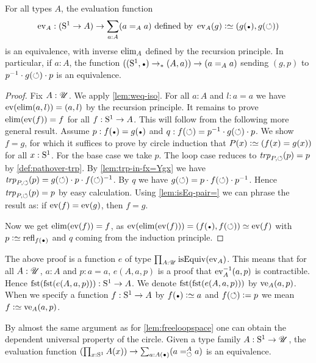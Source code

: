 \begin{lemma}\label{lem:freeloopspace}
For all types $A$, the evaluation function 
\[
\ev_A : (\Sc\to A)\to \sum_{a:A}(a=_Aa)\text{~defined by~} 
\ev_A(g)\defeq (g(\base),g(\Sloop))
\]
is an equivalence, with inverse $\mathrm{elim}_A$ defined by the recursion principle.  
In particular, if $a:A$, the function $((\Sc,\base)\to_* (A,a))\to (a=_Aa)$
sending $(g,p)$ to $p^{-1}\cdot g(\circlearrowleft)\cdot p$ is an equivalence.
\end{lemma}
\begin{proof}
Fix $A:{\mathscr{U}}$. We apply \cref{lem:weq-iso}. 
For all $a:A$ and $l:a=a$ we have $\ev(\el(a,l))=(a,l)$
by the recursion principle. It remains to prove
$\el(\ev(f))=f$ for all $f:{\mathrm{S}^1}\to A$. This will follow
from the following more general result. Assume 
$p: f(\base)= g(\base)$ and $q: f(\circlearrowleft) = p^{-1}\cdot g(\circlearrowleft)\cdot p$.
We show $f=g$, for which it suffices to prove by circle induction
that $P(x)\defeq(f(x)=g(x))$ for all $x:{\mathrm{S}^1}$.
For the base case we take $p$.
The loop case reduces to $\trp[P]{\Sloop}(p)=p$ by \cref{def:pathover-trp}.
By \cref{lem:trp-in-fx=Ygx} we have 
$\trp[P]{\Sloop}(p)=g(\Sloop)\cdot p \cdot f(\Sloop)^{-1}$. 
By $q$ we have $g(\circlearrowleft) = p\cdot f(\circlearrowleft) \cdot p^{-1}$.
Hence $\trp[P]{\Sloop}(p)=p$ by easy calculation.
Using \cref{lem:isEq-pair=} we can phrase the result
as: if $\ev(f)=\ev(g)$, then  $f=g$.

Now we get $\el(\ev(f))=f$, as
$\ev(\el(\ev(f)))=(f(\base),f(\Sloop))\jdeq\ev(f)$ with $p\defeq\refl{f(\base)}$
and $q$ coming from the induction principle.
\end{proof}

{\color{blue}
The above proof is a function $e$ of type $\prod_{A:\UU} \isEq(\ev_A)$.
This means that for all $A:{\mathscr{U}}$, $a:A$ and $p:a=a$, 
$e(A,a,p)$ is a proof that $\ev_A^{-1}(a,p)$ is contractible. Hence 
$\fst(\fst(e(A,a,p))):\Sc\to A$. 
We denote $\fst(\fst(e(A,a,p)))$ by $\ve_A(a,p)$. When we specify a function
$f:{\mathrm{S}^1}\to A$ by $f(\base)\defeq a$ and $f(\circlearrowleft)\mathrel{\vcentcolon=} p$ we mean
$f\defeq\ve_A(a,p)$.
}

\begin{remark}\label{rem:dep-univ-prop-circle}
By almost the same argument as for \cref{lem:freeloopspace}
one can obtain the dependent universal property of the circle.
Given a type family $A:{\mathrm{S}^1}\to{\mathscr{U}}$, the evaluation function
$(\prod_{x:\Sc} A(x))\to \sum_{a:A(\base)}(\pathover a A {\Sloop} a)$
is an equivalence.
\end{remark}


